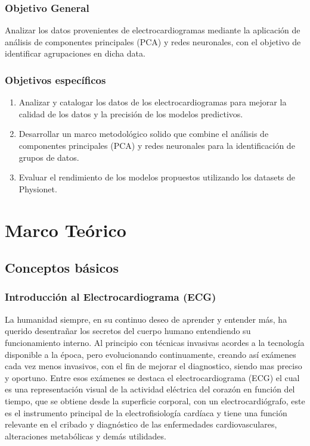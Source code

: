 \documentclass[spanish,11pt,letterpaper,oneside]{memoir}
\begin{document}
\subsection{Objetivo General}
Analizar los datos provenientes de electrocardiogramas mediante la aplicación de análisis de componentes principales (PCA) y redes neuronales, con el objetivo de identificar agrupaciones en dicha data.
\subsection{Objetivos específicos}
\begin{enumerate}
	\item Analizar y catalogar los datos de los electrocardiogramas para mejorar la calidad de los datos y la precisión de los modelos predictivos.
	\item Desarrollar un marco metodológico solido que combine el análisis de componentes principales (PCA) y redes neuronales para la identificación de grupos de datos.
	\item Evaluar el rendimiento de los modelos propuestos utilizando los datasets de Physionet.
\end{enumerate}



\chapter{Marco Teórico}

\section{Conceptos básicos}
\subsection{Introducción al Electrocardiograma (ECG)}
	La humanidad siempre, en su continuo deseo de aprender y entender más, ha querido desentrañar los secretos del cuerpo humano entendiendo su funcionamiento interno. Al principio con técnicas invasivas acordes a la tecnología disponible a la época, pero evolucionando continuamente, creando así exámenes cada vez menos invasivos, con el fin de mejorar el diagnostico, siendo mas preciso y oportuno. Entre esos exámenes se destaca el electrocardiograma (ECG) el cual es una representación visual de la actividad eléctrica del corazón en función del tiempo, que se obtiene desde la superficie corporal, con un electrocardiógrafo, este es el instrumento principal de la electrofisiología cardíaca y tiene una función relevante en el cribado y diagnóstico de las enfermedades cardiovasculares, alteraciones metabólicas y demás utilidades. \\
	\\
\end{document}
